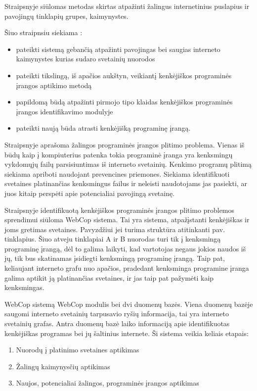 Straipsnyje  siūlomas  metodas skirtas atpažinti žalingus internetinius puslapius ir pavojingų tinklapių grupes, kaimynystes.

Šiuo straipnsiu siekiama \cite{webcop}:
    \begin{itemize}
        \item pateikti sistemą gebančią atpažinti pavojingas bei saugias interneto kaimynystes kurias sudaro svetainių nuorodos
         \item pateikti tikslingą, iš apačios aukštyn, veikiantį kenkėjiškos programinės įrangos aptikimo metodą
         \item papildomą būdą atpažinti pirmojo tipo klaidas kenkėjiškos programinės įrangos identifikavimo modulyje
         \item pateikti naują būda atrasti kenkėjišką programinę įrangą.
    \end{itemize}

Straipsnyje aprašoma žalingos programinės įrangos plitimo problema. Vienas iš būdų kaip į kompiuterius patenka  tokia programinė įranga yra kenksmingų vykdomųjų failų parsisiuntimas iš interneto svetainių. Kenkimo programų plitimą siekiama apriboti naudojant prevencines priemones. Siekiama identifikuoti svetaines platinančias kenksmingus failus ir neleisti naudotojams jas pasiekti, ar juos kitaip perspėti apie potencialiai pavojingą svetainę.

Straipsnyje identifikuotą kenkėjiškos programinės įrangos plitimo problemos sprendimui siūloma WebCop sistema. Tai yra sistema, atpažįstanti kenkėjiškas ir joms gretimas svetaines. Pavyzdžiui jei turima struktūra atitinkanti  pav. tinklapius. Šiuo atveju tinklapiai A ir B nuorodas turi tik į kenksmingą programinę įrangą, dėl to galima laikyti, kad vartotojas negaus jokios naudos iš jų, tik bus skatinamas įsidiegti kenksmingą programinę įrangą. Taip pat, keliaujant interneto grafu nuo apačios, pradedant kenksminga programine įranga galima aptikit ją platinančias svetaines, ir jas taip pat pažymėti kaip kenksmingas.


WebCop sistemą WebCop modulis bei dvi duomenų bazės. Viena duomenų bazėje saugomi interneto svetainių tarpusavio ryšių informacija, tai yra interneto svetainių grafas. Antra duomenų bazė laiko informaciją apie identifikuotas kenkėjiškas programas bei jų šaltinius internete. Ši sistema veikia keliais etapais:
    \begin{enumerate}[label=\arabic*.]
        \item Nuorodų į platinimo svetaines aptikimas
        \item Žalingų kaimynysčių aptikimas
        \item Naujos, potencialiai žalingos, programinės įrangos aptikimas
    \end{enumerate}

